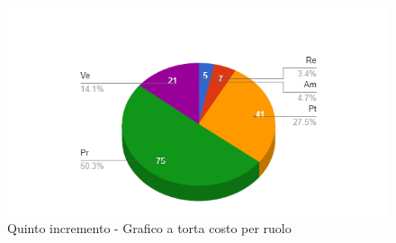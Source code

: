 {{\begin{longtable}{C{.4\freewidth} C{.2\freewidth} C{.2\freewidth} C{.2\freewidth} C{.2\freewidth} C{.2\freewidth} C{.2\freewidth} C{.2\freewidth} C{.2\freewidth}}
        \end{longtable}
        \begin{figure}[H]
          \includegraphics[width=15cm]{sezioni/Images/quintoT.png}
          \centering
          \caption{Quinto incremento - Grafico a torta costo per ruolo}
       \end{figure}
    }
    }

